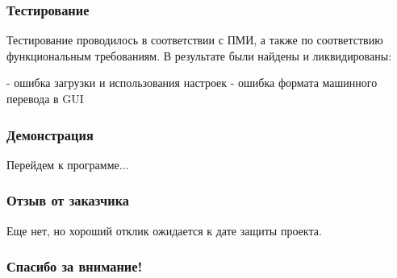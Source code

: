 \documentclass{beamer}
\begin{document}
\begin{frame}
\frametitle{Тестирование}

Тестирование проводилось в соответствии с ПМИ, а также по соответствию функциональным требованиям.
В результате были найдены и ликвидированы:

- ошибка загрузки и использования настроек
- ошибка формата машинного перевода в GUI
\end{frame}
\begin{frame}
\frametitle{Демонстрация}

Перейдем к программе...
\end{frame}
\begin{frame}
\frametitle{Отзыв от заказчика}

Еще нет, но хороший отклик ожидается к дате защиты проекта.

\end{frame}
\begin{frame}[c]
\begin{center}
\frametitle{\LARGE Спасибо за внимание!}

{\LARGE \inserttitle}

\bigskip

{\insertauthor} 

\bigskip\bigskip

{\insertinstitute}

\bigskip\bigskip

{\large \insertdate}
\end{center}
\end{frame}
\end{document}
